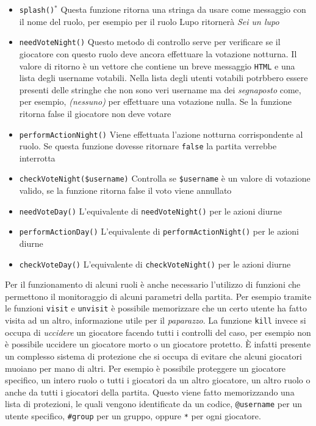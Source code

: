 \begin{itemize}
	\item \texttt{splash()$^*$} Questa funzione ritorna una stringa da usare come messaggio con il nome del ruolo, per esempio per il ruolo Lupo ritornerà \emph{Sei un lupo}
	\item \texttt{needVoteNight()} Questo metodo di controllo serve per verificare se il giocatore con questo ruolo deve ancora effettuare la votazione notturna. Il valore di ritorno è un vettore che contiene un breve messaggio \texttt{HTML} e una lista degli username votabili. Nella lista degli utenti votabili potrbbero essere presenti delle stringhe che non sono veri username ma dei \emph{segnaposto} come, per esempio, \emph{(nessuno)} per effettuare una votazione nulla. Se la funzione ritorna false il giocatore non deve votare
	\item \texttt{performActionNight()} Viene effettuata l'azione notturna corrispondente al ruolo. Se questa funzione dovesse ritornare \texttt{false} la partita verrebbe interrotta
	\item \texttt{checkVoteNight(\$username)} Controlla se \texttt{\$username} è un valore di votazione valido, se la funzione ritorna false il voto viene annullato
	\item \texttt{needVoteDay()} L'equivalente di \texttt{needVoteNight()} per le azioni diurne
	\item \texttt{performActionDay()} L'equivalente di \texttt{performActionNight()} per le azioni diurne
	\item \texttt{checkVoteDay()} L'equivalente di \texttt{checkVoteNight()} per le azioni diurne
\end{itemize}

Per il funzionamento di alcuni ruoli è anche necessario l'utilizzo di funzioni che permettono il monitoraggio di alcuni parametri della partita. Per esempio tramite le funzioni \texttt{visit} e \texttt{unvisit} è possibile memorizzare che un certo utente ha fatto visita ad un altro, informazione utile per il \emph{paparazzo}. La funzione \texttt{kill} invece si occupa di \emph{uccidere} un giocatore facendo tutti i controlli del caso, per esempio non è possibile uccidere un giocatore morto o un giocatore protetto. È infatti presente un complesso sistema di protezione che si occupa di evitare che alcuni giocatori muoiano per mano di altri. Per esempio è possibile proteggere un giocatore specifico, un intero ruolo o tutti i giocatori da un altro giocatore, un altro ruolo o anche da tutti i giocatori della partita. Questo viene fatto memorizzando una lista di protezioni, le quali vengono identificate da un codice, \texttt{@username} per un utente specifico, \texttt{\#group} per un gruppo, oppure \texttt{*} per ogni giocatore.

